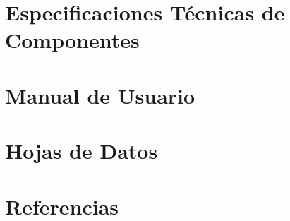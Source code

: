 \documentclass[a4paper,12pt]{report}
\begin{document}
\chapter{Especificaciones Técnicas de Componentes}


\chapter{Manual de Usuario}


\chapter{Hojas de Datos}


\chapter*{Referencias}

\end{document}
